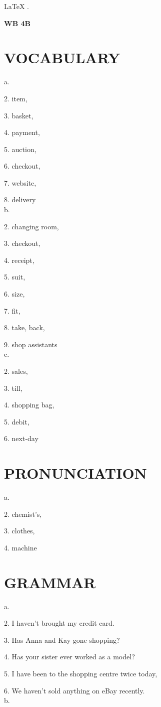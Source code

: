 \documentclass{article}
\begin{document}
\begin{center}
    \color{pink}
    \LARGE
    \LaTeX
    \color{lime}
    .
\end{center}

\textbf{WB 4B}
\section*{VOCABULARY}
a. 

2. item, 

3. basket, 

4. payment, 

5. auction, 

6. checkout, 

7. website, 

8. delivery 
\\
b. 

2. changing room, 

3. checkout, 

4. receipt, 

5. suit, 

6. size, 

7. fit, 

8. take, back, 

9. shop assistants
\\
c. 

2. sales, 

3. till, 

4. shopping bag, 

5. debit,

6. next-day
\section*{PRONUNCIATION}
a.

2. chemist's, 

3. clothes, 

4. machine
\section*{GRAMMAR}


a. 

2. I haven't brought my credit card.


3. Has Anna and Kay gone shopping?

4. Has your sister ever worked as a model?


5. I have been to the shopping centre twice today,


6. We haven't sold anything on eBay recently.
\\
b. 
\end{document}
